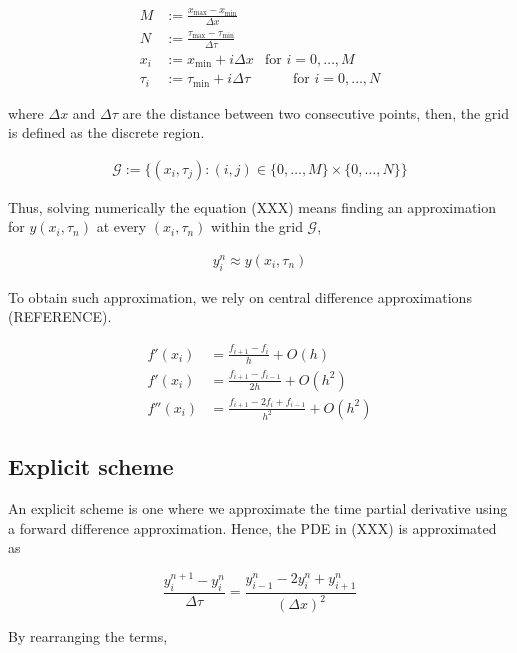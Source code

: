 \begin{align}
  M &:= \frac{x_{\text{max}} - x_{\text{min}}}{\Delta x} \\ 
  N &:= \frac{\tau_{\text{max}} - \tau_{\text{min}}}{\Delta \tau} \\ 
  x_i &:= x_{\text{min}} + i\Delta x & \text{for $i = 0,\dots, M$} \\
  \tau_i &:= \tau_{\text{min}} + i{\Delta \tau} & \qquad \text{for $i = 0,\dots, N$}
\end{align}

where $\Delta x$ and $\Delta \tau$ are the distance between two consecutive points,
then, the grid is defined as the discrete region. 

\begin{align}
  \mathcal{G} := \{(x_i, \tau_j): (i, j) \in \{0,\dots,M\}\times\{0,\dots,N\}\}
\end{align}

Thus, solving numerically the equation (XXX) means finding an approximation for $y(x_i, \tau_n)$ at every 
$(x_i, \tau_n)$ within the grid $\mathcal{G}$,

\begin{align}
  y^{n}_i \approx y(x_i,\tau_n)
\end{align}

To obtain such approximation, we rely on central difference approximations (REFERENCE).

\begin{align}
  f'(x_i) &= \frac{f_{i+1} - f_{i}}{h} + O(h) \\
  f'(x_i) &= \frac{f_{i+1} - f_{i-1}}{2h} + O(h^2) \\
  f''(x_i) &= \frac{f_{i+1} - 2f_{i} + f_{i-1}}{h^2} + O(h^2)
\end{align}

\subsection{Explicit scheme}

An explicit scheme is one where we approximate the time partial derivative using
a forward difference approximation. Hence, the PDE in (XXX) is approximated as

\begin{equation}
  \frac{y^{n+1}_{i} - y^{n}_{i}}{\Delta \tau} = \frac{y^{n}_{i-1} - 2y^{n}_{i} + y^{n}_{i+1}}{(\Delta x)^2}
\end{equation}

By rearranging the terms,

